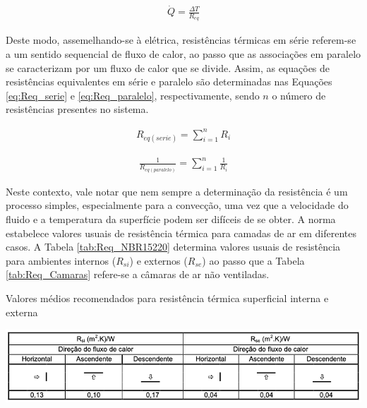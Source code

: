 \documentclass[acronym,symbols,table]{fei}
\begin{document}
\begin{equation} \label{eq:Q_Req}
\begin{aligned}
    \dot{Q}=\frac{\Delta T}{R_{eq}}
\end{aligned}
\end{equation}

Deste modo, assemelhando-se à elétrica, resistências térmicas em série referem-se a um sentido sequencial de fluxo de calor, ao passo que as associações em paralelo se caracterizam por um fluxo de calor que se divide. Assim, as equações de resistências equivalentes em série e paralelo são determinadas nas Equações \ref{eq:Req_serie} e \ref{eq:Req_paralelo}, respectivamente, sendo $n$ o número de resistências presentes no sistema.

\begin{equation} \label{eq:Req_serie}
\begin{aligned}
    {R}_{eq(serie)}=\sum^{n}_{i=1}{R_{i}}
\end{aligned}
\end{equation}

\begin{equation} \label{eq:Req_paralelo}
\begin{aligned}
    \frac{1}{R_{eq(paralelo)}} = \sum_{i=1}^{n} \frac{1}{R_i}
\end{aligned}
\end{equation}

Neste contexto, vale notar que nem sempre a determinação da resistência é um processo simples, especialmente para a convecção, uma vez que a velocidade do fluido e a temperatura da superfície podem ser difíceis de se obter. A norma \textcite{abnt15220} estabelece valores usuais de resistência térmica para camadas de ar em diferentes casos. A Tabela \ref{tab:Req_NBR15220} determina valores usuais de resistência para ambientes internos ($R_{si}$) e externos ($R_{se}$) ao passo que a Tabela \ref{tab:Req_Camaras} refere-se a câmaras de ar não ventiladas.

\begin{table}[!htb] 
 \centering
    \caption{Valores médios recomendados para resistência térmica superficial interna e externa}
    \includegraphics[width=1.0\linewidth]{Tabelas/Req_Interna_NBR15220.png}
    \label{tab:Req_NBR15220}
\end{table}
\end{document}
